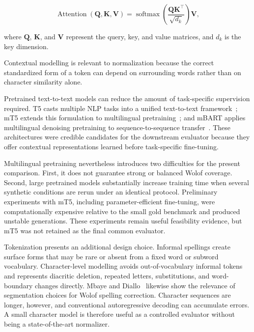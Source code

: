 \documentclass[12pt, a4paper, twoside, openany]{report}
\begin{document}
\begin{equation}
	\operatorname{Attention}(\mathbf{Q},\mathbf{K},\mathbf{V})
	=
	\operatorname{softmax}
	\left(
	\frac{\mathbf{Q}\mathbf{K}^{\top}}{\sqrt{d_k}}
	\right)
	\mathbf{V},
	\label{eq:attention}
\end{equation}

where $\mathbf{Q}$, $\mathbf{K}$, and $\mathbf{V}$ represent the query, key, and value matrices, and $d_k$ is the key dimension.

Contextual modelling is relevant to normalization because the correct standardized form of a token can depend on surrounding words rather than on character similarity alone.

Pretrained text-to-text models can reduce the amount of task-specific supervision required. T5 casts multiple \ac{NLP} tasks into a unified text-to-text framework~\cite{raffel2020t5}; mT5 extends this formulation to multilingual pretraining~\cite{xue2021mt5}; and mBART applies multilingual denoising pretraining to sequence-to-sequence transfer~\cite{liu2020mdenoising}. These architectures were credible candidates for the downstream evaluator because they offer contextual representations learned before task-specific fine-tuning.

Multilingual pretraining nevertheless introduces two difficulties for the present comparison. First, it does not guarantee strong or balanced Wolof coverage. Second, large pretrained models substantially increase training time when several synthetic conditions are rerun under an identical protocol. Preliminary experiments with mT5, including parameter-efficient fine-tuning, were computationally expensive relative to the small gold benchmark and produced unstable generations. These experiments remain useful feasibility evidence, but mT5 was not retained as the final common evaluator.

Tokenization presents an additional design choice. Informal spellings create surface forms that may be rare or absent from a fixed word or subword vocabulary. Character-level modelling avoids out-of-vocabulary informal tokens and represents diacritic deletion, repeated letters, substitutions, and word-boundary changes directly. Mbaye and Diallo~\cite{mbaye2025beqi} likewise show the relevance of segmentation choices for Wolof spelling correction. Character sequences are longer, however, and conventional autoregressive decoding can accumulate errors. A small character model is therefore useful as a controlled evaluator without being a state-of-the-art normalizer.
\end{document}
